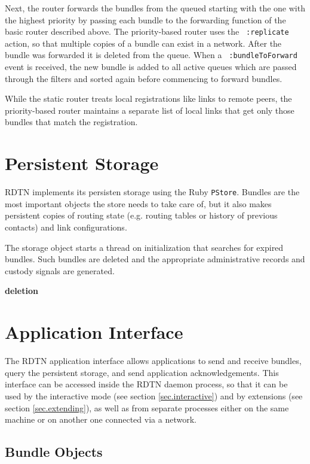 \documentclass{article}
\begin{document}
Next, the router forwards the bundles from the queued starting with the one with
the highest priority by passing each bundle to the forwarding function of the
basic router described above. The priority-based router uses the {\tt
:replicate} action, so that multiple copies of a bundle can exist in a network.
After the bundle was forwarded it is deleted from the queue. When a {\tt
:bundleToForward} event is received, the new bundle is added to all active
queues which are passed through the filters and sorted again before commencing
to forward bundles.

While the static router treats local registrations like links to remote peers,
the priority-based router maintains a separate list of local links that get only
those bundles that match the registration.

\section{Persistent Storage}\label{sec.storage}

RDTN implements its persisten storage using the Ruby {\tt PStore}.
Bundles are the most important objects the store needs to take care of, but
it also makes persistent copies of routing state (e.g. routing
tables or history of previous contacts) and link configurations.

The storage object starts a thread on initialization that searches
for expired bundles. Such bundles are deleted and the appropriate administrative
records and custody signals are generated.

{\bf deletion}

\section{Application Interface}\label{sec.appif}

The RDTN application interface allows applications to send and receive bundles,
query the persistent storage, and send application acknowledgements. This
interface can be accessed inside the RDTN daemon process, so that it can be used
by the interactive mode (see section \ref{sec.interactive}) and by extensions
(see section \ref{sec.extending}), as well as from separate processes either on
the same machine or on another one connected via a network.

\subsection{Bundle Objects}\label{sec.bundle-obj}
\end{document}
